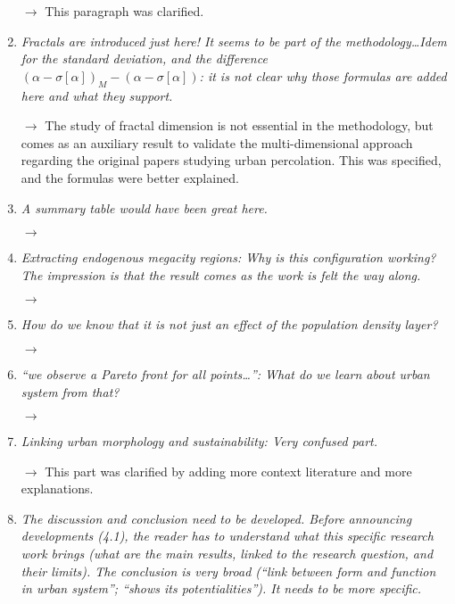 \documentclass[11pt,a4paper,sans]{moderncv}        %
\begin{document}
\begin{enumerate}
$\rightarrow$ This paragraph was clarified.

\medskip


\item \textit{Fractals are introduced just here! It seems to be part of the methodology\ldots Idem for the standard deviation, and the difference $(\alpha - \sigma \left[\alpha\right])_M - (\alpha - \sigma\left[\alpha\right])$: it is not clear why those formulas are added here and what they support.}

$\rightarrow$ The study of fractal dimension is not essential in the methodology, but comes as an auxiliary result to validate the multi-dimensional approach regarding the original papers studying urban percolation. This was specified, and the formulas were better explained.

\medskip

\item \textit{A summary table would have been great here.}

$\rightarrow$

\medskip

\item \textit{Extracting endogenous megacity regions: Why is this configuration working? The impression is that the result comes as the work is felt the way along.}

$\rightarrow$

\medskip

\item \textit{How do we know that it is not just an effect of the population density layer?}

$\rightarrow$

\medskip

\item \textit{``we observe a Pareto front for all points\ldots'': What do we learn about urban system from that?}

$\rightarrow$

\medskip


\item \textit{Linking urban morphology and sustainability: Very confused part.}

$\rightarrow$ This part was clarified by adding more context literature and more explanations.


\medskip


\item \textit{The discussion and conclusion need to be developed. Before announcing developments (4.1), the reader has to understand what this specific research work brings (what are the main results, linked to the research question, and their limits). The conclusion is very broad (“link between form and function in urban system”; “shows its potentialities”). It needs to be more specific.}


\end{enumerate}
\end{document}
